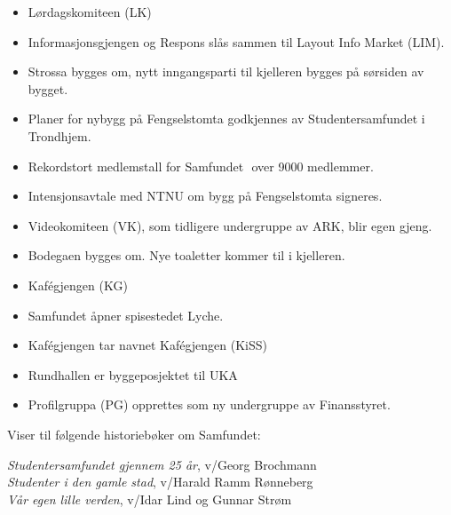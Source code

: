 
\begin{itemize}
  \item Lørdagskomiteen (LK)
\end{itemize}


\begin{itemize}
  \item Informasjonsgjengen og Respons slås sammen til Layout Info Market (LIM).
  \item Strossa bygges om, nytt inngangsparti til kjelleren bygges på sørsiden av bygget.
\end{itemize}


\begin{itemize}
  \item Planer for nybygg på Fengselstomta godkjennes av Studentersamfundet i Trondhjem.
\end{itemize}


\begin{itemize}
  \item Rekordstort medlemstall for Samfundet  over 9000 medlemmer.
  \item Intensjonsavtale med NTNU om bygg på Fengselstomta signeres.
  \item Videokomiteen (VK), som tidligere undergruppe av ARK, blir egen gjeng.
  \item Bodegaen bygges om. Nye toaletter kommer til i kjelleren.
  \item Kafégjengen (KG)
\end{itemize}


\begin{itemize}
  \item Samfundet åpner spisestedet Lyche.
  \item Kafégjengen tar navnet Kafégjengen (KiSS)
\end{itemize}


\begin{itemize}
  \item Rundhallen er byggeposjektet til UKA
  \item Profilgruppa (PG) opprettes som ny undergruppe av Finansstyret.
\end{itemize}

Viser til følgende historiebøker om Samfundet:

\textit{Studentersamfundet gjennem 25 år}, v/Georg Brochmann\\
\textit{Studenter i den gamle stad}, v/Harald Ramm Rønneberg\\
\textit{Vår egen lille verden}, v/Idar Lind og Gunnar Strøm\\
